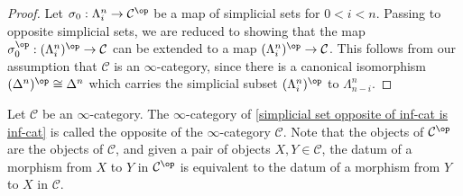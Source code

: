 \begin{proof}
Let $\sigma_0:\Lambda_i^n\to\mathcal{C}^{\op}$ be a map of simplicial sets for $0<i<n$. Passing to opposite simplicial sets, we are reduced to showing that the map $\sigma_0^{\op}:(\Lambda_i^n)^{\op}\to\mathcal{C}$ can be extended to a map $(\Lambda_i^n)^{\op}\to\mathcal{C}$. This follows from our assumption that $\mathcal{C}$ is an $\infty$-category, since there is a canonical isomorphism $(\Delta^n)^{\op}\cong\Delta^n$ which carries the simplicial subset $(\Lambda^n_i)^{\op}$ to $\Lambda^n_{n-i}$.
\end{proof}
Let $\mathcal{C}$ be an $\infty$-category. The $\infty$-category of \cref{simplicial set opposite of inf-cat is inf-cat} is called the opposite of the $\infty$-category $\mathcal{C}$. Note that the objects of $\mathcal{C}^{\op}$ are the objects of $\mathcal{C}$, and given a pair of objects $X,Y\in\mathcal{C}$, the datum of a morphism from $X$ to $Y$ in $\mathcal{C}^{\op}$ is equivalent to the datum of a morphism from $Y$ to $X$ in $\mathcal{C}$.
